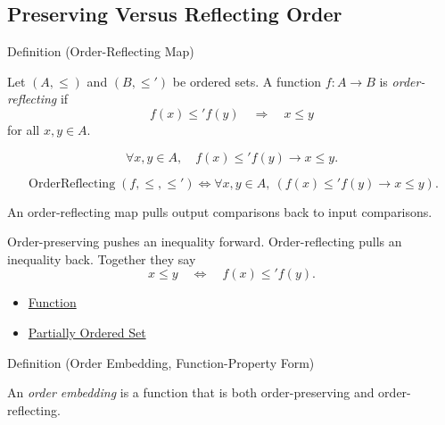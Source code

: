 
\subsection*{Preserving Versus Reflecting Order}

\begin{definitionbox}{Definition (Order-Reflecting Map)}
\begin{definition}\label{def:order-reflecting-map}
Let $(A,\leq)$ and $(B,\leq')$ be ordered sets. A function $f:A\to B$ is
\emph{order-reflecting} if
\[
f(x)\leq' f(y)\quad\Longrightarrow\quad x\leq y
\]
for all $x,y\in A$.
\end{definition}
\end{definitionbox}

\begin{remark*}
\[
  \forall x,y\in A,\quad
  f(x)\leq' f(y)\to x\leq y.
\]
\end{remark*}

\begin{remark*}
\[
  \operatorname{OrderReflecting}(f,\leq,\leq')
  \iff
  \forall x,y\in A,\ (f(x)\leq' f(y)\to x\leq y).
\]
\end{remark*}

\begin{remark*}[Interpretation]
An order-reflecting map pulls output comparisons back to input comparisons.
\end{remark*}

\begin{remark*}[Exposition]
Order-preserving pushes an inequality forward. Order-reflecting pulls an
inequality back. Together they say
\[
x\leq y \quad\Longleftrightarrow\quad f(x)\leq' f(y).
\]
\end{remark*}

\begin{dependencies}
\begin{itemize}
  \item \hyperref[def:function]{Function}
  \item \hyperref[def:partially-ordered-set]{Partially Ordered Set}
\end{itemize}
\end{dependencies}

\begin{definitionbox}{Definition (Order Embedding, Function-Property Form)}
\begin{definition}\label{def:order-embedding-function-form}
An \emph{order embedding} is a function that is both order-preserving and
order-reflecting.
\end{definition}
\end{definitionbox}

